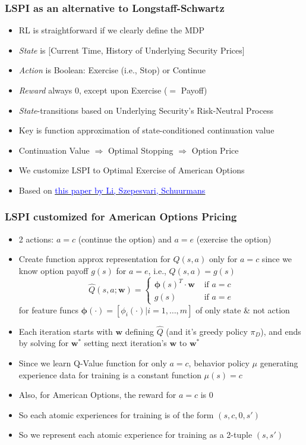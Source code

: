 \documentclass{beamer}
\begin{document}
\begin{frame}
\frametitle{LSPI as an alternative to Longstaff-Schwartz}
\pause
\begin{itemize}[<+->]
\item RL is straightforward if we clearly define the MDP
\item {\em State} is [Current Time, History of Underlying Security Prices]
\item {\em Action} is Boolean: Exercise (i.e., Stop) or Continue
\item {\em Reward} always 0, except upon Exercise ($=$ Payoff)
\item {\em State}-transitions based on Underlying Security's Risk-Neutral Process
\item Key is function approximation of state-conditioned continuation value
\item Continuation Value $\Rightarrow$ Optimal Stopping $\Rightarrow$ Option Price
\item We customize LSPI to Optimal Exercise of American Options
\item Based on \href{http://proceedings.mlr.press/v5/li09d/li09d.pdf}{\underline{\textcolor{blue}{this paper by Li, Szepesvari, Schuurmans}}}
\end{itemize}
\end{frame}

\begin{frame}
\frametitle{LSPI customized for American Options Pricing}
\pause
\begin{itemize}[<+->]
\item 2 actions: $a=c$ (continue the option) and $a=e$ (exercise the option)
\item Create function approx representation for $Q(s,a)$ only for $a=c$ since we know option payoff $g(s)$ for $a=e$, i.e., $Q(s,a) = g(s)$
$$
\hat{Q}(s,a; \bm{w}) =
\begin{cases}
\bm{\phi}(s)^T \cdot \bm{w} & \text{ if } a = c \\
g(s) & \text{ if } a = e
\end{cases}
$$
for feature funcs $\bm{\phi}(\cdot) = [\phi_i(\cdot)|i = 1, \ldots, m]$ of only state \& not action
\item Each iteration starts with $\bm{w}$ defining $\hat{Q}$ (and it's greedy policy $\pi_D$), and ends by solving for $\bm{w}^*$ setting next iteration's $\bm{w}$ to $\bm{w}^*$
\item Since we learn Q-Value function for only $a=c$, behavior policy $\mu$ generating experience data for training is a constant function $\mu(s) = c$
\item Also, for American Options, the reward for $a=c$ is 0
\item So each atomic experiences for training is of the form $(s,c,0,s')$
\item So we represent each atomic experience for training as a 2-tuple $(s,s')$
\end{itemize}
\end{frame}
\end{document}
